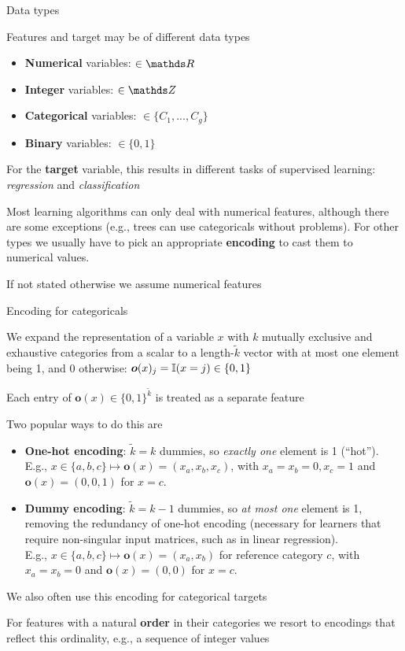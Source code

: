 \documentclass[11pt,compress,t,notes=noshow, xcolor=table]{beamer}
\begin{document}
\begin{framei}{Data types}
\item Features and target may be of different data types 
\begin{itemize}
\item \textbf{Numerical} variables: $\in \R$
\item \textbf{Integer} variables:  $\in \Z$
\item \textbf{Categorical} variables: $\in \{C_1,...,C_g\}$
\item \textbf{Binary} variables:   $\in \{0, 1\}$
\end{itemize}
\item For the \textbf{target} variable, this results in different tasks of supervised learning: \textit{regression} and \textit{classification}
\item Most learning algorithms can only deal with numerical features, although there are some exceptions (e.g., trees can use categoricals without problems).
For other types we usually have to pick an appropriate \textbf{encoding} to cast them to numerical values.
\item If not stated otherwise we assume numerical features
\end{framei}


\begin{framei}[fs=small]{Encoding for categoricals}
\item We expand the representation of a variable $x$ with $k$ mutually exclusive and exhaustive categories from a scalar to a length-$\tilde k$ vector with at most one element being 1, and 0 otherwise: $\bm{o}(x)_j =\mathbb{I}(x = j) \in \{0,1\}$
\item Each entry of $\bm{o}(x)\in \{0,1\}^{\tilde k}$ is treated as a separate feature
\item Two popular ways to do this are
\begin{itemize}\footnotesize
\item \textbf{One-hot encoding}: $\tilde k = k$ dummies, so \textit{exactly one} element is 1 (\enquote{hot}).
E.g., $x \in \{ a, b, c\} \mapsto \bm{o}(x) = (x_a, x_b, x_c)$, with $x_a = x_b = 0, x_c = 1$ and $\bm{o}(x) = (0, 0, 1)$ for $x = c$.
\item \textbf{Dummy encoding}: $\tilde k = k - 1$ dummies, so \textit{at most one} element is 1, removing the redundancy of one-hot encoding (necessary for learners that require non-singular input matrices, such as in linear regression). \\
E.g., $x \in \{ a, b, c\} \mapsto \bm{o}(x) = (x_a, x_b)$ for reference category $c$, with $x_a = x_b = 0$ and $\bm{o}(x) = (0, 0)$ for $x = c$.
\end{itemize}
\item We also often use this encoding for categorical targets
\item For features with a natural \textbf{order} in their categories we resort to encodings that reflect this ordinality, e.g., a sequence of integer values
\end{framei}
\end{document}
